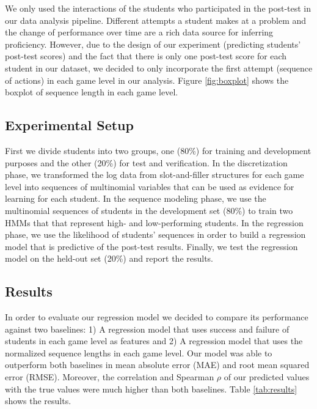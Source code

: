 \documentclass{sigchi}
\begin{document}
We only used the interactions of the students who participated in the post-test in our data analysis pipeline.
Different attempts a student makes at a problem and the change of performance over time are a rich data source for inferring proficiency.
However, due to the design of our experiment (predicting students' post-test scores) and the fact that there is only one post-test score for each student in our dataset, we decided to  only incorporate the first attempt (sequence of actions) in each game level in our analysis. Figure \ref{fig:boxplot} shows the boxplot of sequence length in each game level. 

\subsection{Experimental Setup}
First we divide students into two groups, one (80\%) for training and development purposes and the other (20\%) for test and verification.
In the discretization phase, we transformed the log data from slot-and-filler structures for each game level into sequences of multinomial variables that can be used as evidence for learning for each student.
In the sequence modeling phase, we use the multinomial sequences of students in the development set (80\%) to train two HMMs that that represent high- and low-performing students.
In the regression phase, we use the likelihood of students' sequences in order to build a regression model that is predictive of the post-test results.
Finally, we test the regression model on the held-out set (20\%) and report the results.


\subsection{Results}
In order to evaluate our regression model we decided to compare its performance against two baselines: 1) A regression model that uses success and failure of students in each game level as features and 2) A regression model that uses the normalized sequence lengths in each game level. 
Our model was able to outperform both baselines in mean absolute error (MAE) and root mean squared error (RMSE). 
Moreover, the correlation and Spearman $\rho$ of our predicted values with the true values were much higher than both baselines. 
Table \ref{tab:results} shows the results.
\end{document}
